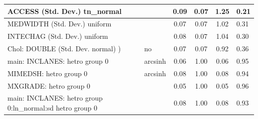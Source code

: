 \begin{table}
\begin{center}
\begin{tabular}{|l|l|c|c|c|l|}
			\hline
			ACCESS (Std. Dev.) tn_normal &  & 0.09 & 0.07 & 1.25 & 0.21 \\
			\hline
			MEDWIDTH (Std. Dev.) uniform &  & 0.07 & 0.07 & 1.02 & 0.31 \\
			\hline
			INTECHAG (Std. Dev.) uniform &  & 0.08 & 0.07 & 1.04 & 0.30 \\
			\hline
			 Chol: DOUBLE (Std. Dev. normal) ) & no & 0.07 & 0.07 & 0.92 & 0.36 \\
			\hline
			main: INCLANES: hetro group 0 & arcsinh & 0.06 & 1.00 & 0.06 & 0.95 \\
			\hline
			MIMEDSH: hetro group 0 & arcsinh & 0.08 & 1.00 & 0.08 & 0.94 \\
			\hline
			MXGRADE: hetro group 0 &  & 0.05 & 1.00 & 0.05 & 0.96 \\
			\hline
			main: INCLANES: hetro group 0:ln_normal:sd  hetro group 0 &  & 0.08 & 1.00 & 0.08 & 0.93 \\
			\hline
		\end{tabular}
	\end{center}
\end{table}